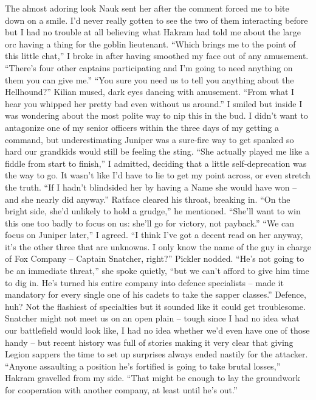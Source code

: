 \documentclass[12pt, openany]{book}
\begin{document}
The almost adoring look Nauk sent her after the comment forced me to bite down on a smile. I’d never really gotten to see the two of them interacting before but I had no trouble at all believing what Hakram had told me about the large orc having a thing for the goblin lieutenant.
“Which brings me to the point of this little chat,” I broke in after having smoothed my face out of any amusement. “There’s four other captains participating and I’m going to need anything on them you can give me.”
“You sure you need us to tell you anything about the Hellhound?” Kilian mused, dark eyes dancing with amusement. “From what I hear you whipped her pretty bad even without us around.”
I smiled but inside I was wondering about the most polite way to nip this in the bud. I didn’t want to antagonize one of my senior officers within the three days of my getting a command, but underestimating Juniper was a sure-fire way to get spanked so hard our grandkids would still be feeling the sting.
“She actually played me like a fiddle from start to finish,” I admitted, deciding that a little self-deprecation was the way to go. It wasn’t like I’d have to lie to get my point across, or even stretch the truth. “If I hadn’t blindsided her by having a Name she would have won – and she nearly did anyway.”
Ratface cleared his throat, breaking in.
“On the bright side, she’d unlikely to hold a grudge,” he mentioned. “She’ll want to win this one too badly to focus on us: she’ll go for victory, not payback.”
“We can focus on Juniper later,” I agreed. “I think I’ve got a decent read on her anyway, it’s the other three that are unknowns. I only know the name of the guy in charge of Fox Company – Captain Snatcher, right?”
Pickler nodded.
“He’s not going to be an immediate threat,” she spoke quietly, “but we can’t afford to give him time to dig in. He’s turned his entire company into defence specialists – made it mandatory for every single one of his cadets to take the sapper classes.”
Defence, huh? Not the flashiest of specialties but it sounded like it could get troublesome. Snatcher might not meet us on an open plain – tough since I had no idea what our battlefield would look like, I had no idea whether we’d even have one of those handy – but recent history was full of stories making it very clear that giving Legion sappers the time to set up surprises always ended nastily for the attacker.
“Anyone assaulting a position he’s fortified is going to take brutal losses,” Hakram gravelled from my side. “That might be enough to lay the groundwork for cooperation with another company, at least until he’s out.”
\end{document}
